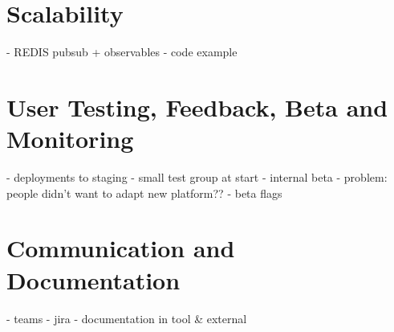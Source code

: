 \section{Scalability}

- REDIS pubsub + observables
- code example

\section{User Testing, Feedback, Beta and Monitoring}
- deployments to staging
- small test group at start
- internal beta
 - problem: people didn't want to adapt new platform??
- beta flags

\section{Communication and Documentation}

- teams
- jira
- documentation in tool \& external
